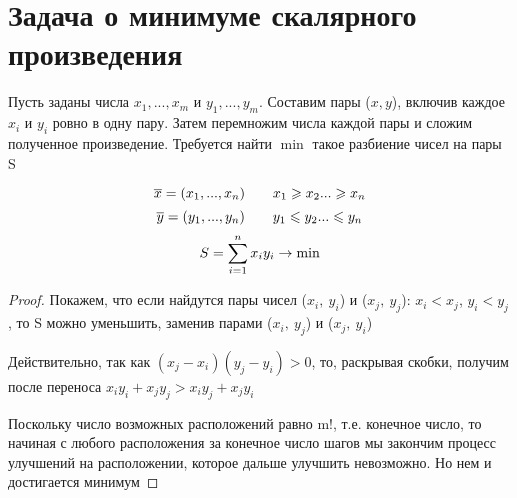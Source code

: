 \documentclass[discrete.tex]{subfiles}
\begin{document}
  \section{Задача о минимуме скалярного произведения}
  
  Пусть заданы числа $x_1,...,x_m$ и $y_1,...,y_m$. Составим пары ($x,y$), включив каждое $x_i$ и $y_i$ ровно в одну пару. Затем перемножим числа каждой пары и сложим полученное произведение. Требуется найти $\min$ такое разбиение чисел на пары S
  \begin{Theorem}
    \[\overline{x} = (x_1,...,x_n) \qquad x_1 \geqslant x_2 ... \geqslant x_n\]
    \[\overline{y} = (y_1,...,y_n) \qquad y_1 \leqslant y_2 ... \leqslant y_n\]
    \[S = \sum_{i=1}^n x_i y_i \rightarrow \min\]
  \end{Theorem}

  \begin{proof}
    Покажем, что если найдутся пары чисел ($x_i,\ y_i$) и ($x_j,\ y_j$): $x_i < x_j$, $y_i < y_j$, то S можно уменьшить, заменив парами ($x_i,\ y_j$) и ($x_j,\ y_i$)

    Действительно, так как $(x_j-x_i)(y_j-y_i)>0$, то, раскрывая скобки, получим после переноса $x_i y_i + x_j y_j > x_i y_j + x_j y_i$

    Поскольку число возможных расположений равно m!, т.е. конечное число, то начиная с любого расположения за конечное число шагов мы закончим процесс улучшений на расположении, которое дальше улучшить невозможно. Но нем и достигается минимум
  \end{proof}
\end{document}
